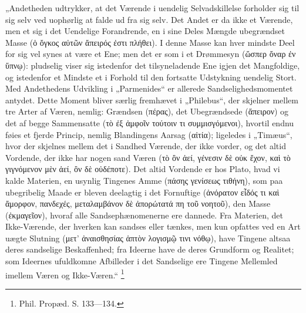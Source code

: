 \documentclass[11pt]{book}
\newcommand{\opage}[1]{\marginnote{\footnotesize\textit{[#1]}}}
\begin{document}
„Andetheden udtrykker, at det Værende i uendelig Selvadskillelse
forholder sig til sig selv ved uophørlig at falde ud fra sig selv.
Det Andet er da ikke et Værende, men et sig i det Uendelige
Forandrende, en i sine Deles Mængde ubegrændset Masse (ὁ ὄγκος
αὐτῶν ἄπειρός ἐστι πλήθει). I denne Masse kan hver mindste Deel
for sig vel synes at være et Ene; men det er som i et Drømmesyn
(ὥσπερ ὄναρ ἐν ὕπνῳ): pludselig viser sig istedenfor det
tilsyneladende
\opage{183} \setcounter{footnote}{0}%
Ene igjen det Mangfoldige, og istedenfor et Mindste et i Forhold
til den fortsatte Udstykning uendelig Stort. Med Andethedens
Udvikling i „Parmenides“ er allerede Sandselighedsmomentet antydet.
Dette Moment bliver særlig fremhævet i „Philebus“, der skjelner
mellem tre Arter af Væren, nemlig: Grændsen (πέρας), det
Ubegrændsede (ἄπειρον) og det af begge Sammensatte (τὸ ἐξ ἀμφοῖν
τούτοιν τι συμμισγόμενοι), hvortil endnu føies et fjerde Princip,
nemlig Blandingens Aarsag (αἰτία); ligeledes i „Timæus“, hvor der
skjelnes mellem det i Sandhed Værende, der ikke vorder, og det
altid Vordende, der ikke har nogen sand Væren (τὸ ὂν ἀεί, γένεσιν
δὲ οὐκ ἔχον, καὶ τὸ γιγνόμενον μὲν ἀεί, ὂν δὲ οὐδέποτε). Det
altid Vordende er hos Plato, hvad vi kalde Materien, en usynlig
Tingenes Amme (πάσης γενίσεως τιθήνη), som paa ubegribelig Maade
er bleven deelagtig i det Fornuftige (ἀνόρατον εἶδός τι καὶ
ἄμορφον, πανδεχές, μεταλαμβάνον δὲ ἀπορώτατά πη τοῦ νοητοῦ), den
Masse (ἐκμαγεῖον), hvoraf alle Sandsephænomenerne ere dannede. Fra
Materien, det Ikke-Værende, der hverken kan sandses eller tænkes,
men kun opfattes ved en Art uægte Slutning (μετ’ ἀναισθησίας
ἁπτὸν λογισμῷ τινι νόθῳ), have Tingene altsaa deres sandselige
Beskaffenhed; fra Ideerne have de deres Grundform og Realitet; som
Ideernes ufuldkomne Afbilleder i det Sandselige ere Tingene
Mellemled imellem Væren og Ikke-Væren.“%
\footnote{Phil. Propæd. S. 133---134.}
\end{document}
